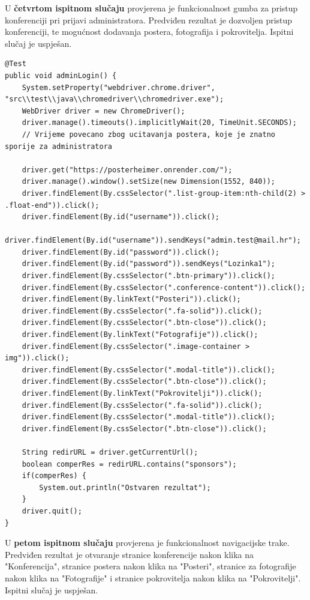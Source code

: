 			
			
			U \textbf{četvrtom ispitnom slučaju} provjerena je funkcionalnost gumba za pristup konferenciji pri prijavi administratora. Predviđen rezultat je dozvoljen pristup konferenciji, te mogućnost dodavanja postera, fotografija i pokrovitelja. Ispitni slučaj je uspješan.
			
			\begin{lstlisting}
@Test
public void adminLogin() {
	System.setProperty("webdriver.chrome.driver", "src\\test\\java\\chromedriver\\chromedriver.exe");
	WebDriver driver = new ChromeDriver();
	driver.manage().timeouts().implicitlyWait(20, TimeUnit.SECONDS);
	// Vrijeme povecano zbog ucitavanja postera, koje je znatno sporije za administratora
	
	driver.get("https://posterheimer.onrender.com/");
	driver.manage().window().setSize(new Dimension(1552, 840));
	driver.findElement(By.cssSelector(".list-group-item:nth-child(2) > .float-end")).click();
	driver.findElement(By.id("username")).click();
	driver.findElement(By.id("username")).sendKeys("admin.test@mail.hr");
	driver.findElement(By.id("password")).click();
	driver.findElement(By.id("password")).sendKeys("Lozinka1");
	driver.findElement(By.cssSelector(".btn-primary")).click();
	driver.findElement(By.cssSelector(".conference-content")).click();
	driver.findElement(By.linkText("Posteri")).click();
	driver.findElement(By.cssSelector(".fa-solid")).click();
	driver.findElement(By.cssSelector(".btn-close")).click();
	driver.findElement(By.linkText("Fotografije")).click();
	driver.findElement(By.cssSelector(".image-container > img")).click();
	driver.findElement(By.cssSelector(".modal-title")).click();
	driver.findElement(By.cssSelector(".btn-close")).click();
	driver.findElement(By.linkText("Pokrovitelji")).click();
	driver.findElement(By.cssSelector(".fa-solid")).click();
	driver.findElement(By.cssSelector(".modal-title")).click();
	driver.findElement(By.cssSelector(".btn-close")).click();
	
	String redirURL = driver.getCurrentUrl();
	boolean comperRes = redirURL.contains("sponsors");
	if(comperRes) {
		System.out.println("Ostvaren rezultat");
	}
	driver.quit();
}
			\end{lstlisting}
			
	\newpage
			
	U \textbf{petom ispitnom slučaju} provjerena je funkcionalnost navigacijske trake. Predviđen rezultat je otvaranje stranice konferencije nakon klika na "Konferencija", stranice postera nakon klika na "Posteri", stranice za fotografije nakon klika na "Fotografije" i stranice pokrovitelja nakon klika na "Pokrovitelji". Ispitni slučaj je uspješan.
	
